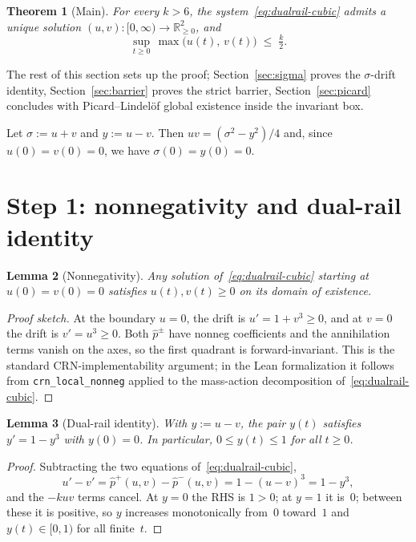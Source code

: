 \documentclass[11pt]{article}
\newtheorem{theorem}{Theorem}
\newtheorem{lemma}[theorem]{Lemma}
\newcommand{\R}{\mathbb{R}}
\begin{document}
\begin{theorem}[Main]\label{thm:main}
For every $k > 6$, the system~\eqref{eq:dualrail-cubic} admits a unique solution
$(u, v)\colon [0, \infty) \to \R_{\ge 0}^{2}$, and
\[
  \sup_{t \ge 0}\, \max\bigl(u(t),\, v(t)\bigr) \;\le\; \tfrac{k}{2}.
\]
\end{theorem}

The rest of this section sets up the proof; Section~\ref{sec:sigma} proves the
$\sigma$-drift identity, Section~\ref{sec:barrier} proves the strict barrier,
Section~\ref{sec:picard} concludes with Picard--Lindel\"of global existence
inside the invariant box.

\medskip
Let $\sigma := u + v$ and $y := u - v$.  Then $uv = (\sigma^{2} - y^{2})/4$ and,
since $u(0) = v(0) = 0$, we have $\sigma(0) = y(0) = 0$.

\section{Step 1: nonnegativity and dual-rail identity}

\begin{lemma}[Nonnegativity]\label{lem:nonneg}
Any solution of~\eqref{eq:dualrail-cubic} starting at $u(0) = v(0) = 0$
satisfies $u(t), v(t) \ge 0$ on its domain of existence.
\end{lemma}

\begin{proof}[Proof sketch]
At the boundary $u = 0$, the drift is $u' = 1 + v^{3} \ge 0$, and at $v = 0$
the drift is $v' = u^{3} \ge 0$.  Both $\hat{p}^{\pm}$ have nonneg coefficients
and the annihilation terms vanish on the axes, so the first quadrant is
forward-invariant.  This is the standard CRN-implementability argument; in the
Lean formalization it follows from \texttt{crn\_local\_nonneg} applied to the
mass-action decomposition of~\eqref{eq:dualrail-cubic}.
\end{proof}

\begin{lemma}[Dual-rail identity]\label{lem:identity}
With $y := u - v$, the pair $y(t)$ satisfies $y' = 1 - y^{3}$ with $y(0) = 0$.
In particular, $0 \le y(t) \le 1$ for all $t \ge 0$.
\end{lemma}

\begin{proof}
Subtracting the two equations of~\eqref{eq:dualrail-cubic},
\[
  u' - v' = \hat{p}^{+}(u,v) - \hat{p}^{-}(u,v) = 1 - (u-v)^{3} = 1 - y^{3},
\]
and the $- k u v$ terms cancel.  At $y = 0$ the RHS is $1 > 0$; at $y = 1$ it
is~$0$; between these it is positive, so $y$ increases monotonically from~$0$
toward~$1$ and $y(t) \in [0, 1)$ for all finite~$t$.
\end{proof}
\end{document}
